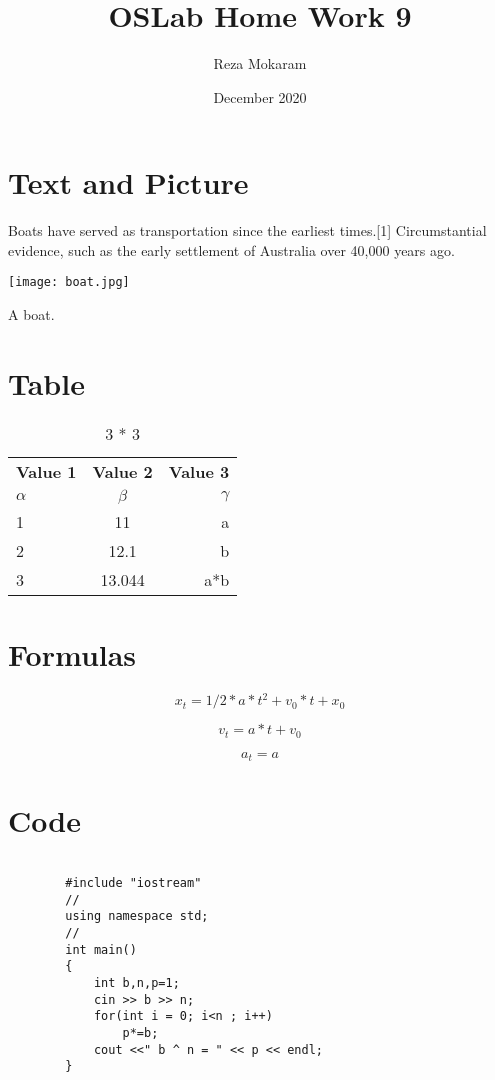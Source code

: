\documentclass{article}
\title{OSLab Home Work 9}
\author{Reza Mokaram}
\date{December 2020}
\begin{document}
\maketitle

\section*{Text and Picture}
       Boats have served as transportation since the earliest times.[1] Circumstantial evidence, such as the early settlement of Australia over 40,000 years ago.

  \begin{center}
  \texttt{[image: boat.jpg]}
  \caption{A boat.}
  \end{center}
  
  
  \section*{Table}
  
  \begin{table}[h!]
  \begin{center}
    \caption{ 3 * 3}
    \label{tab:table}
    \begin{tabular}{l|c|r}
      \textbf{Value 1} & \textbf{Value 2} & \textbf{Value 3}\\
      $\alpha$ & $\beta$ & $\gamma$ \\
      \hline
      1 & 11 & a\\
      2 & 12.1 & b\\
      3 & 13.044 & a*b\\
    \end{tabular}
  \end{center}
\end{table}


\section*{Formulas}

\begin{equation*}
  x_t = 1/2 * a * t^2 + v_0 * t + x_0
\end{equation*}

\begin{equation*}
    v_t = a * t + v_0
\end{equation*}

\begin{equation*}
    a_t = a
\end{equation*}


\section*{Code}
\begin{lstlisting}

        #include "iostream"
        //
        using namespace std;
        //
        int main()
        {
            int b,n,p=1;
            cin >> b >> n;
            for(int i = 0; i<n ; i++)
                p*=b;
            cout <<" b ^ n = " << p << endl;
        }

    \end{lstlisting}
\end{document}
